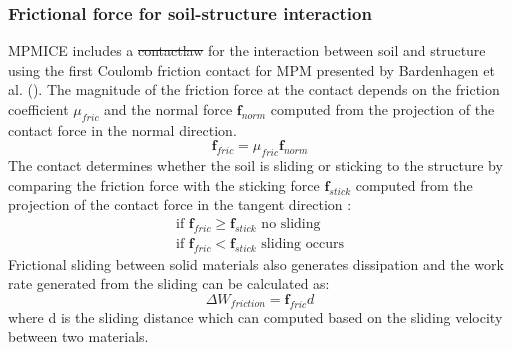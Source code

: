 \documentclass[preprint,12pt]{elsarticle}
\providecommand{\DIFadd}[1]{{\protect\color{blue}\uwave{#1}}} %
\providecommand{\DIFdel}[1]{{\protect\color{red}\sout{#1}}}                      %
\providecommand{\DIFaddbegin}{} %
\providecommand{\DIFaddend}{} %
\providecommand{\DIFdelbegin}{} %
\providecommand{\DIFdelend}{} %
\newcommand{\DIFscaledelfig}{0.5}
\newlength{\DIFdelgraphicswidth} %
\newlength{\DIFdelgraphicsheight} %
\newcommand{\DIFaddincludegraphics}[2][]{{\color{blue}\fbox{\DIFOincludegraphics[#1]{#2}}}} %
\newcommand{\DIFdelincludegraphics}[2][]{%
\sbox{\DIFdelgraphicsbox}{\DIFOincludegraphics[#1]{#2}}%
\settoboxwidth{\DIFdelgraphicswidth}{\DIFdelgraphicsbox} %
\settoboxtotalheight{\DIFdelgraphicsheight}{\DIFdelgraphicsbox} %
\scalebox{\DIFscaledelfig}{%
\parbox[b]{\DIFdelgraphicswidth}{\usebox{\DIFdelgraphicsbox}\\[-\baselineskip] \rule{\DIFdelgraphicswidth}{0em}}\llap{\resizebox{\DIFdelgraphicswidth}{\DIFdelgraphicsheight}{%
\setlength{\unitlength}{\DIFdelgraphicswidth}%
\begin{picture}(1,1)%
\thicklines\linethickness{2pt} %
{\color[rgb]{1,0,0}\put(0,0){\framebox(1,1){}}}%
{\color[rgb]{1,0,0}\put(0,0){\line( 1,1){1}}}%
{\color[rgb]{1,0,0}\put(0,1){\line(1,-1){1}}}%
\end{picture}%
}\hspace*{3pt}}} %
} %
\DeclareRobustCommand{\DIFaddbegin}{\DIFOaddbegin \let\includegraphics\DIFaddincludegraphics} %
\DeclareRobustCommand{\DIFaddend}{\DIFOaddend \let\includegraphics\DIFOincludegraphics} %
\DeclareRobustCommand{\DIFdelbegin}{\DIFOdelbegin \let\includegraphics\DIFdelincludegraphics} %
\DeclareRobustCommand{\DIFdelend}{\DIFOaddend \let\includegraphics\DIFOincludegraphics} %
\begin{document}
\subsubsection{Frictional force for soil-structure interaction}
MPMICE includes a \DIFdelbegin \DIFdel{contactlaw }\DIFdelend \DIFaddbegin \DIFadd{contact law }\DIFaddend for the interaction between soil and structure using the first Coulomb friction contact for MPM presented by Bardenhagen et al. (\cite{MPMcontact}).  The magnitude of the friction force at the contact depends on the friction coefficient $\mu_{fric}$ and the normal force  $ \pmb{f}_{norm}$  computed from the projection of the contact force  in the normal direction.
%
\begin{equation}
   \pmb{f}_{fric} = \mu_{fric}  \pmb{f}_{norm}
\end {equation}
%
%
The contact determines whether the soil is sliding or sticking to the structure by comparing the friction force with the sticking force $\pmb{f}_{stick}$  computed from the projection of the contact force in the tangent direction \DIFaddbegin \DIFadd{as}\DIFaddend :
%
\begin{equation}
\begin{gathered}
\textrm{   if    }    \pmb{f}_{fric} \geq  \pmb{f}_{stick}   \textrm{    no sliding    } \\
\textrm{    if    }   \pmb{f}_{fric} <   \pmb{f}_{stick}   \textrm{    sliding occurs    }  
\end {gathered}
\end {equation}
Frictional sliding between solid materials also generates dissipation and the work rate generated from the sliding can be calculated as:
%
\begin{equation}
   \Delta W_{friction} = \pmb{f}_{fric} d
\end {equation}
%
%
where d is the sliding distance which can computed based on the sliding velocity between two materials. 
\end{document}

